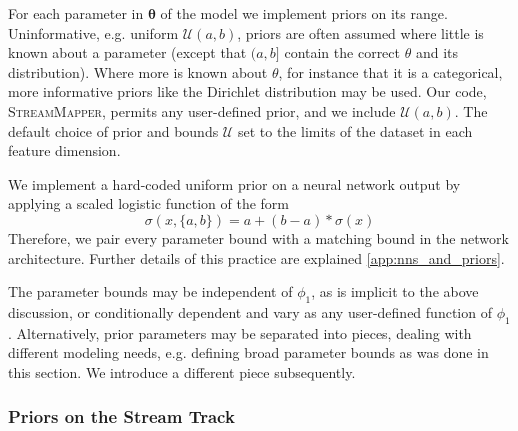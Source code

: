 \documentclass[twocolumn, linenumbers]{aastex631}
\newcommand{\code}[1]{\textsc{#1}}
\newcommand{\package}[1]{\code{#1}}
\newcommand{\mbs}[1]{\boldsymbol{#1}}
\newcommand{\mcal}[1]{\mathcal{#1}}
\begin{document}
            For each parameter in $\mbs{\theta}$ of the model we implement
            priors on its range.  Uninformative, e.g. uniform $\mcal{U}(a, b)$,
            priors are often assumed where little is known about a parameter
            (except that $(a,b]$ contain the correct $\theta$ and its
            distribution). Where more is known about $\theta$, for instance that
            it is a categorical, more informative priors like the Dirichlet
            distribution \citep{Christopher2016} may be used. Our code,
            \package{StreamMapper}, permits any user-defined prior, and we
            include $\mcal{U}(a, b)$.  The default choice of prior and bounds
            $\mcal{U}$ set to the limits of the dataset in each feature
            dimension.

            We implement a hard-coded uniform prior on a neural network output
            by applying a scaled logistic function of the form
            \begin{equation}\label{eq:scaled_logistic}
                  \sigma(x, \{a,b\}) = a + (b - a) * \sigma(x)
            \end{equation}
            Therefore, we pair every parameter bound with a matching bound in
            the network architecture. Further details of this practice are
            explained \autoref{app:nns_and_priors}.

            The parameter bounds may be independent of $\phi_1$, as is implicit
            to the above discussion, or conditionally dependent and vary as any
            user-defined function of $\phi_1$.  Alternatively, prior parameters
            may be separated into pieces, dealing with different modeling needs,
            e.g. defining broad parameter bounds as was done in this section.
            We introduce a different piece subsequently.


        \subsubsection{Priors on the Stream Track} \label{sub:methods:priors:track_region_prior}
\end{document}
